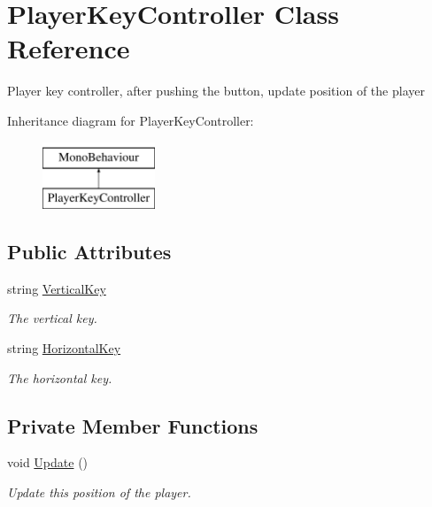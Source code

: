\hypertarget{class_player_key_controller}{}\section{Player\+Key\+Controller Class Reference}
\label{class_player_key_controller}


Player key controller, after pushing the button, update position of the player  


Inheritance diagram for Player\+Key\+Controller\+:\begin{figure}[H]
\begin{center}
\leavevmode
\includegraphics[height=2.000000cm]{class_player_key_controller}
\end{center}
\end{figure}
\subsection*{Public Attributes}
\begin{DoxyCompactItemize}
\item 
string \mbox{\hyperlink{class_player_key_controller_af6f283b7608be96f62f9af15b75c2691}{Vertical\+Key}}
\begin{DoxyCompactList}\small\item\em The vertical key. \end{DoxyCompactList}\item 
string \mbox{\hyperlink{class_player_key_controller_a0905f484ede4072fc87e2c7e46d45bed}{Horizontal\+Key}}
\begin{DoxyCompactList}\small\item\em The horizontal key. \end{DoxyCompactList}\end{DoxyCompactItemize}
\subsection*{Private Member Functions}
\begin{DoxyCompactItemize}
\item 
void \mbox{\hyperlink{class_player_key_controller_adb9fec464f806430557e5d4f2fd1fdcf}{Update}} ()
\begin{DoxyCompactList}\small\item\em Update this position of the player. \end{DoxyCompactList}\end{DoxyCompactItemize}


